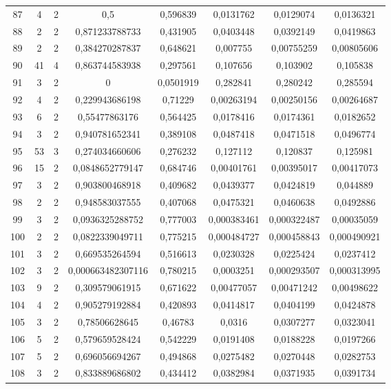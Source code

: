 \begin{longtable}{|c|c|c|c|c|c|c|c|}
87 & 4 & 2 & 0,5 & 0,596839 & 0,0131762 & 0,0129074 & 0,0136321  \\
88 & 2 & 2 & 0,871233788733 & 0,431905 & 0,0403448 & 0,0392149 & 0,0419863  \\
89 & 2 & 2 & 0,384270287837 & 0,648621 & 0,007755 & 0,00755259 & 0,00805606  \\
90 & 41 & 4 & 0,863744583938 & 0,297561 & 0,107656 & 0,103902 & 0,105838  \\
91 & 3 & 2 & 0 & 0,0501919 & 0,282841 & 0,280242 & 0,285594  \\
92 & 4 & 2 & 0,229943686198 & 0,71229 & 0,00263194 & 0,00250156 & 0,00264687  \\
93 & 6 & 2 & 0,55477863176 & 0,564425 & 0,0178416 & 0,0174361 & 0,0182652  \\
94 & 3 & 2 & 0,940781652341 & 0,389108 & 0,0487418 & 0,0471518 & 0,0496774  \\
95 & 53 & 3 & 0,274034660606 & 0,276232 & 0,127112 & 0,120837 & 0,125981  \\
96 & 15 & 2 & 0,0848652779147 & 0,684746 & 0,00401761 & 0,00395017 & 0,00417073  \\
97 & 3 & 2 & 0,903800468918 & 0,409682 & 0,0439377 & 0,0424819 & 0,044889  \\
98 & 2 & 2 & 0,948583037555 & 0,407068 & 0,0475321 & 0,0460638 & 0,0492886  \\
99 & 3 & 2 & 0,0936325288752 & 0,777003 & 0,000383461 & 0,000322487 & 0,00035059  \\
100 & 2 & 2 & 0,0822339049711 & 0,775215 & 0,000484727 & 0,000458843 & 0,000490921  \\
101 & 3 & 2 & 0,669535264594 & 0,516613 & 0,0230328 & 0,0225424 & 0,0237412  \\
102 & 3 & 2 & 0,000663482307116 & 0,780215 & 0,0003251 & 0,000293507 & 0,000313995  \\
103 & 9 & 2 & 0,309579061915 & 0,671622 & 0,00477057 & 0,00471242 & 0,00498622  \\
104 & 4 & 2 & 0,905279192884 & 0,420893 & 0,0414817 & 0,0404199 & 0,0424878  \\
105 & 3 & 2 & 0,78506628645 & 0,46783 & 0,0316 & 0,0307277 & 0,0323041  \\
106 & 5 & 2 & 0,579659528424 & 0,542229 & 0,0191408 & 0,0188228 & 0,0197266  \\
107 & 5 & 2 & 0,696056694267 & 0,494868 & 0,0275482 & 0,0270448 & 0,0282753  \\
108 & 3 & 2 & 0,833889686802 & 0,434412 & 0,0382984 & 0,0371935 & 0,0391734  \\

\end{longtable}
